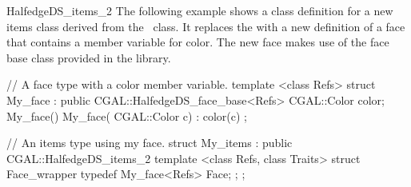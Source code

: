 \begin{ccRefClass}{HalfedgeDS_items_2}
The following example shows a class definition for a new items class
derived from the \ccRefName\ class. It replaces the 
with a new definition of a face that contains a member variable for
color. The new face makes use of the face base class provided in the
library.

\begin{ccExampleCode}
// A face type with a color member variable.
template <class Refs>
struct My_face : public CGAL::HalfedgeDS_face_base<Refs> {
    CGAL::Color color;
    My_face() {}
    My_face( CGAL::Color c) : color(c) {}
};

// An items type using my face.
struct My_items : public CGAL::HalfedgeDS_items_2 {
    template <class Refs, class Traits>
    struct Face_wrapper {
        typedef My_face<Refs> Face;
    };
};
\end{ccExampleCode}

\end{ccRefClass}

\ccRefPageEnd

